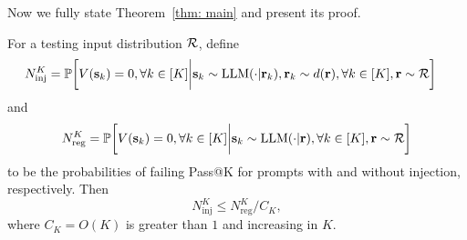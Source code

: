 Now we fully state Theorem~\ref{thm: main} and present its proof. 
\begin{theorem} 
For a testing input distribution $\mathcal{R}$, define
\begin{equation}
\begin{aligned}
N_{\text{inj}}^K = \mathbb{P} \bigg[ V(\mathbf{s}_k) = 0, \forall k \in [K] \bigg|& \mathbf{s}_k \sim \text{LLM}(\cdot | \mathbf{r}_k), \mathbf{r}_k \sim d(\mathbf{r}), \forall k \in [K], \mathbf{r} \sim \mathcal{R} \bigg]
\end{aligned}
\end{equation}
and
\begin{equation}
N_{\text{reg}}^K = \mathbb{P} \bigg[ V(\mathbf{s}_k) = 0, \forall k \in [K] \bigg| \mathbf{s}_k \sim \text{LLM}(\cdot | \mathbf{r}), \forall k \in [K], \mathbf{r} \sim \mathcal{R} \bigg]
\end{equation}
to be the probabilities of failing Pass@K for prompts with and without injection, respectively. Then
$$ N_{\text{inj}}^K \leq N_{\text{reg}}^K / C_K, $$
where $C_K = O(K)$ is greater than $1$ and increasing in $K$. 
\end{theorem}

